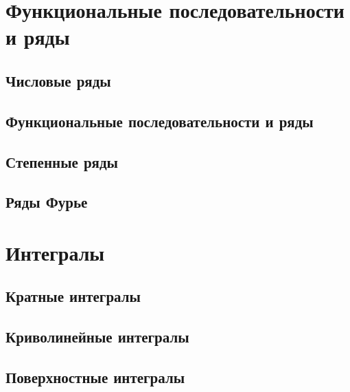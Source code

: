 \documentclass[a4paper,12pt]{book}
\numberwithin{equation}{section}
\theoremstyle{plain}
\theoremstyle{definition}
\theoremstyle{remark}
\begin{document}
  
  \tableofcontents

  \part{Функциональные последовательности и ряды}
  \chapter{Числовые ряды}
  
  \chapter{Функциональные последовательности и ряды}
  
  \chapter{Степенные ряды}
  
  \chapter{Ряды Фурье}
  
  \part{Интегралы}
  \chapter{Кратные интегралы}
  
  \chapter{Криволинейные интегралы}
  
  \chapter{Поверхностные интегралы}
  
\end{document}
